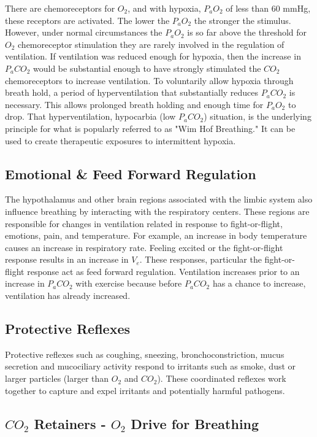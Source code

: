 There are chemoreceptors for $O_2$, and with hypoxia, $P_aO_2$ of less than 60 mmHg, these receptors are activated. The lower the $P_aO_2$ the stronger the stimulus. However, under normal circumstances the $P_aO_2$ is so far above the threshold for $O_2$ chemoreceptor stimulation they are rarely involved in the regulation of ventilation. If ventilation was reduced enough for hypoxia, then the increase in $P_aCO_2$ would be substantial enough to have strongly stimulated the $CO_2$ chemoreceptors to increase ventilation. To voluntarily allow hypoxia through breath hold, a period of hyperventilation that substantially reduces $P_aCO_2$ is necessary. This allows prolonged breath holding and enough time for $P_aO_2$ to drop. That hyperventilation, hypocarbia (low $P_aCO_2$) situation, is the underlying principle for what is popularly referred to as "Wim Hof Breathing." It can be used to create therapeutic exposures to intermittent hypoxia.

\subsection{Emotional \& Feed Forward Regulation}
The hypothalamus and other brain regions associated with the limbic system also influence breathing by interacting with the respiratory centers. These regions are responsible for changes in ventilation related in response to fight-or-flight, emotions, pain, and temperature. For example, an increase in body temperature causes an increase in respiratory rate. Feeling excited or the fight-or-flight response results in an increase in $V_e$. These responses, particular the fight-or-flight response act as feed forward regulation. Ventilation increases prior to an increase in $P_aCO_2$ with exercise because before $P_aCO_2$ has a chance to increase, ventilation has already increased.

\subsection{Protective Reflexes}

Protective reflexes such as coughing, sneezing, bronchoconstriction, mucus secretion and mucociliary activity respond to irritants such as smoke, dust or larger particles (larger than $O_2$ and $CO_2$). These coordinated reflexes work together to capture and expel irritants and potentially harmful pathogens.

\subsection{$CO_2$ Retainers - $O_2$ Drive for Breathing}

